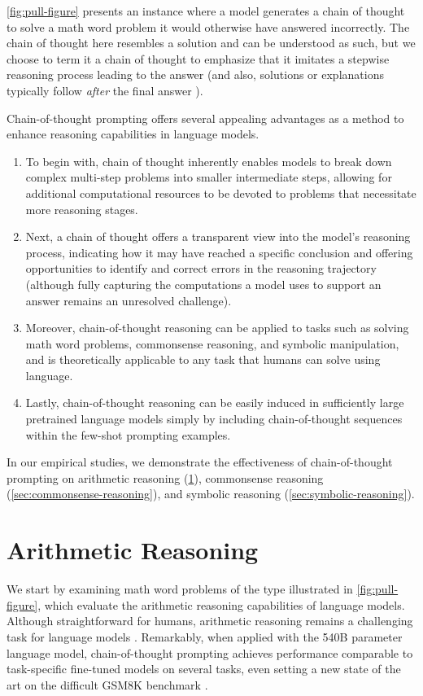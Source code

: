 \cref{fig:pull-figure} presents an instance where a model generates a chain of thought to solve a math word problem it would otherwise have answered incorrectly. The chain of thought here resembles a solution and can be understood as such, but we choose to term it a chain of thought to emphasize that it imitates a stepwise reasoning process leading to the answer (and also, solutions or explanations typically follow \textit{after} the final answer \citep[][\textit{inter alia}]{narang2020wt5,wiegreffe2021reframing,lampinen2022can}).

Chain-of-thought prompting offers several appealing advantages as a method to enhance reasoning capabilities in language models.

\begin{enumerate}[topsep=1pt,itemsep=0ex]
    \item To begin with, chain of thought inherently enables models to break down complex multi-step problems into smaller intermediate steps, allowing for additional computational resources to be devoted to problems that necessitate more reasoning stages.
    \item Next, a chain of thought offers a transparent view into the model’s reasoning process, indicating how it may have reached a specific conclusion and offering opportunities to identify and correct errors in the reasoning trajectory (although fully capturing the computations a model uses to support an answer remains an unresolved challenge).
    \item Moreover, chain-of-thought reasoning can be applied to tasks such as solving math word problems, commonsense reasoning, and symbolic manipulation, and is theoretically applicable to any task that humans can solve using language.
    \item Lastly, chain-of-thought reasoning can be easily induced in sufficiently large pretrained language models simply by including chain-of-thought sequences within the few-shot prompting examples.
\end{enumerate}

In our empirical studies, we demonstrate the effectiveness of chain-of-thought prompting on arithmetic reasoning (\cref{sec:arithmetic-reasoning}), commonsense reasoning (\cref{sec:commonsense-reasoning}), and symbolic reasoning (\cref{sec:symbolic-reasoning}).

\section{Arithmetic Reasoning}\label{sec:arithmetic-reasoning}
We start by examining math word problems of the type illustrated in \cref{fig:pull-figure}, which evaluate the arithmetic reasoning capabilities of language models. Although straightforward for humans, arithmetic reasoning remains a challenging task for language models \citep[][\textit{inter alia}]{hendrycks2021measuring,patel-etal-2021-nlp}. Remarkably, when applied with the 540B parameter language model, chain-of-thought prompting achieves performance comparable to task-specific fine-tuned models on several tasks, even setting a new state of the art on the difficult GSM8K benchmark \citep{cobbe2021training}.

